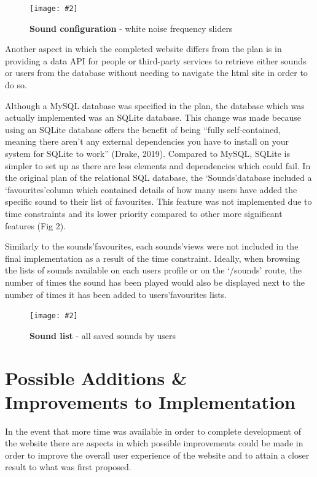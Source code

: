 \documentclass[10pt, a4paper]{article}
\newcommand{\figuremacro}[5]{
    \begin{figure}[#1]
        \centering
        \texttt{[image: \#2]}
        \caption[#3]{\textbf{#3}#4}
        \label{fig:#2}
    \end{figure}
}
\begin{document}
\figuremacro{h}{1}{Sound configuration}{ - white noise frequency sliders}{1.0}

Another aspect in which the completed website differs from the plan is in providing a data API for people or third-party services to retrieve either sounds or users from the database without needing to navigate the html site in order to do so. 

Although a MySQL database was specified in the plan, the database which was actually implemented was an SQLite database. This change was made because using an SQLite database offers the benefit of being ``fully self-contained, meaning there aren\rq t any external dependencies you have to install on your system for SQLite to work'' (Drake, 2019)\cite{digitalocean_2019}. Compared to MySQL, SQLite is simpler to set up as there are less elements and dependencies which could fail.
\clearpage
In the original plan of the relational SQL database, the \lq Sounds\rq \enspace database included a \lq favourites\rq \enspace column which contained details of how many users have added the specific sound to their list of favourites. This feature was not implemented due to time constraints and its lower priority compared to other more significant features (Fig 2).

Similarly to the sounds\rq \enspace favourites, each sounds\rq \enspace views were not included in the final implementation as a result of the time constraint. Ideally, when browsing the lists of sounds available on each users profile or on the `/sounds' route, the number of times the sound has been played would also be displayed next to the number of times it has been added to users\rq \enspace favourites lists.


\figuremacro{h}{2}{Sound list}{ - all saved sounds by users}{1.0}





\section{Possible Additions \& Improvements to Implementation}
In the event that more time was available in order to complete development of the website there are aspects in which possible improvements could be made in order to improve the overall user experience of the website and to attain a closer result to what was first proposed.
\end{document}
